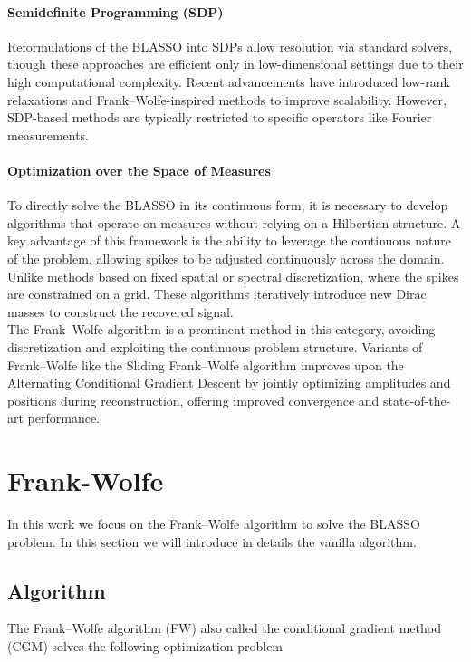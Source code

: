 \documentclass[a4paper,12pt,oneside]{report}
\theoremstyle{named}
\begin{document}
\paragraph{Semidefinite Programming (SDP)}
Reformulations of the BLASSO into SDPs \cite{Candes2012} allow resolution via standard solvers, though these approaches are efficient only in low-dimensional settings due to their high computational complexity. Recent advancements \cite{Catala_2017} have introduced low-rank relaxations and Frank–Wolfe-inspired methods to improve scalability. However, SDP-based methods are typically restricted to specific operators like Fourier measurements.

\paragraph{Optimization over the Space of Measures}
To directly solve the BLASSO in its continuous form, it is necessary to develop algorithms that operate on measures without relying on a Hilbertian structure. A key advantage of this framework is the ability to leverage the continuous nature of the problem, allowing spikes to be adjusted continuously across the domain. Unlike methods based on fixed spatial or spectral discretization, where the spikes are constrained on a grid. These algorithms iteratively introduce new Dirac masses to construct the recovered signal. \\


The Frank–Wolfe \cite{Frank1956} algorithm is a prominent method in this category, avoiding discretization and exploiting the continuous problem structure. Variants of Frank–Wolfe like the Sliding Frank–Wolfe \cite{Denoyelle_2020} algorithm improves upon the Alternating Conditional Gradient Descent \cite{Boyd2015} by jointly optimizing amplitudes and positions during reconstruction, offering improved convergence and state-of-the-art performance.

\section{Frank-Wolfe}
In this work we focus on the Frank–Wolfe algorithm to solve the BLASSO problem. In this section we will introduce in details the vanilla algorithm.

\subsection{Algorithm}

The Frank–Wolfe \cite{Frank1956} algorithm (FW) also called the conditional gradient method (CGM) \cite{Levitin1966} solves the following optimization problem
\end{document}
